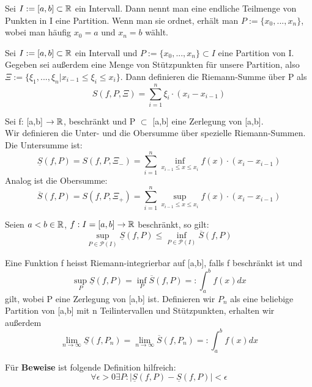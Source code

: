 
\begin{definition}[Partition = Zerlegung]
Sei $I:=[a,b]\subset \mathbb{R}$ ein Intervall. Dann nennt man eine endliche Teilmenge von Punkten in I eine Partition. Wenn man sie ordnet, erhält man $P:=\{x_0,...,x_n\}$, wobei man häufig $x_0=a$ und $x_n=b$ wählt.
\end{definition}

\begin{definition}
Sei $I:=[a,b]\subset \mathbb{R}$ ein Intervall und $P:=\{x_0,...,x_n\}\subset I$ eine Partition von I. Gegeben sei außerdem eine Menge von Stützpunkten für unsere Partition, also $\Xi := \{\xi_1, ..., \xi_n| x_{i-1}\leq \xi_i\leq x_i\}$. Dann definieren die Riemann-Summe über P als
$$S(f, P, \Xi) = \sum_{i=1}^n\xi_i\cdot(x_i-x_{i-1})$$
\end{definition}

\begin{definition}

Sei f: [a,b] $\rightarrow \mathbb{R}$, beschränkt und P $\subset$ [a,b] eine Zerlegung von [a,b].\\ Wir definieren die Unter- und die Obersumme über spezielle Riemann-Summen.
Die Untersumme ist: 
$$\underline{S}(f,P) = S(f, P, \Xi_-) = \sum_{i=1}^n\inf\limits_{x_{i-1}\leq x \leq x_i} f(x)\cdot(x_i-x_{i-1})$$
Analog ist die Obersumme:
$$\overline{S}(f,P) = S(f, P, \Xi_+) = \sum\limits_{i=1}^n\sup\limits_{x_{i-1}\leq x \leq x_i} f(x)\cdot(x_i-x_{i-1})$$
\end{definition}

\begin{theorem}
Seien $a<b\in\mathbb{R}$, $f: I=[a,b] \to\mathbb{R}$ beschränkt, so gilt:
$$\sup\limits_{P\in\mathcal{P}(I)}\underline{S}(f,P) \leq \inf\limits_{P\in\mathcal{P}(I)}\overline{S}(f,P)$$
\end{theorem}

\begin{definition}

Eine Funktion f heisst Riemann-integrierbar auf [a,b], falls f beschränkt ist und
$$\sup\limits_{P} \underline{S}(f, P) = \inf\limits_{P} \overline{S}(f, P) =: \int_a^b f(x) dx$$
gilt, wobei P eine Zerlegung von [a,b] ist.
Definieren wir $P_n$ als eine beliebige Partition von [a,b] mit n Teilintervallen und Stützpunkten, erhalten wir außerdem
$$\lim\limits_{n\rightarrow\infty} \underline{S}(f, P_n) = \lim\limits_{n\rightarrow\infty} \overline{S}(f, P_n) =: \int_a^b f(x) dx$$

Für \textbf{Beweise} ist folgende Definition hilfreich:
$$\forall \epsilon > 0 \exists P :|\underline{S}(f,P) - \underline{S}(f,P)| < \epsilon$$
\end{definition}

